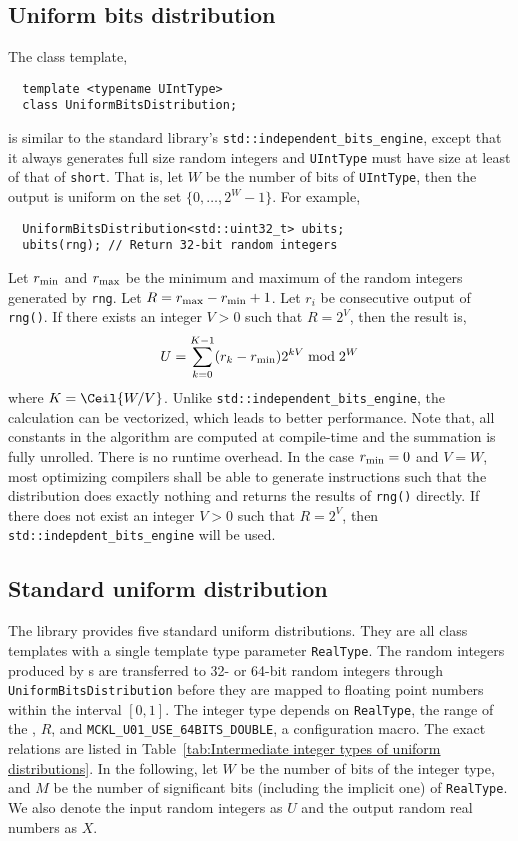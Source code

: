\subsection{Uniform bits distribution}
\label{sub:Uniform bits distribution}

The class template,
\begin{Verbatim}
  template <typename UIntType>
  class UniformBitsDistribution;
\end{Verbatim}
is similar to the standard library's \verb|std::independent_bits_engine|,
except that it always generates full size random integers and \verb|UIntType|
must have size at least of that of \verb|short|. That is, let $W$ be the number
of bits of \verb|UIntType|, then the output is uniform on the set
$\{0,\dots,2^W - 1\}$. For example,
\begin{Verbatim}
  UniformBitsDistribution<std::uint32_t> ubits;
  ubits(rng); // Return 32-bit random integers
\end{Verbatim}
Let $r_{\mathrm{min}}$ and $r_{\mathrm{max}}$ be the minimum and maximum of the random integers
generated by \verb|rng|. Let $R = r_{\mathrm{max}} - r_{\mathrm{min}} + 1$. Let $r_i$ be consecutive
output of \verb|rng()|. If there exists an integer $V > 0$ such that $R = 2^V$,
then the result is,
\begin{equation*}
  U = \sum_{k = 0}^{K - 1} (r_k - r_{\mathrm{min}}) 2^{kV} \bmod 2^W
\end{equation*}
where $K = \Ceil{W / V}$. Unlike \verb|std::independent_bits_engine|, the
calculation can be vectorized, which leads to better performance. Note that,
all constants in the algorithm are computed at compile-time and the summation
is fully unrolled. There is no runtime overhead. In the case $r_{\mathrm{min}} = 0$ and $V
= W$, most optimizing compilers shall be able to generate instructions such
that the distribution does exactly nothing and returns the results of
\verb|rng()| directly. If there does not exist an integer $V > 0$ such that $R
= 2^V$, then \verb|std::indepdent_bits_engine| will be used.

\subsection{Standard uniform distribution}
\label{sub:Standard uniform distribution}

The library provides five standard uniform distributions. They are all class
templates with a single template type parameter \verb|RealType|. The random
integers produced by \rng{}s are transferred to 32- or 64-bit random integers
through \verb|UniformBitsDistribution| before they are mapped to floating point
numbers within the interval $[0, 1]$. The integer type depends on
\verb|RealType|, the range of the \rng{}, $R$, and
\verb|MCKL_U01_USE_64BITS_DOUBLE|, a configuration macro. The exact relations
are listed in Table~\ref{tab:Intermediate integer types of uniform
  distributions}. In the following, let $W$ be the number of bits of the
integer type, and $M$ be the number of significant bits (including the implicit
one) of \verb|RealType|. We also denote the input random integers as $U$ and
the output random real numbers as $X$.

